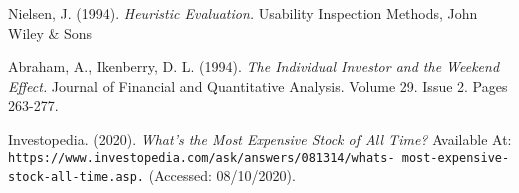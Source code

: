 \documentclass[11pt, english]{article}
\begin{document}
\newpage

	\renewcommand\refname{Bibliography}

	\fancyhead[L]{\leftmark}

	\begin{thebibliography}{9}

		Nielsen, J. (1994).
		\textsl{Heuristic Evaluation.}
		Usability Inspection Methods, John Wiley \& Sons





		Abraham, A., Ikenberry, D. L. (1994).
		\textsl{The Individual Investor and the Weekend Effect.}
		Journal of Financial and Quantitative Analysis. Volume 29. Issue 2. Pages 263-277.
	
		Investopedia. (2020).
		\textsl{What’s the Most Expensive Stock of All Time?}
		Available At:
		\texttt{https://www.investopedia.com/ask/answers/081314/whats- most-expensive-stock-all-time.asp.}
		(Accessed: 08/10/2020).

	\end{thebibliography}
\end{document}
